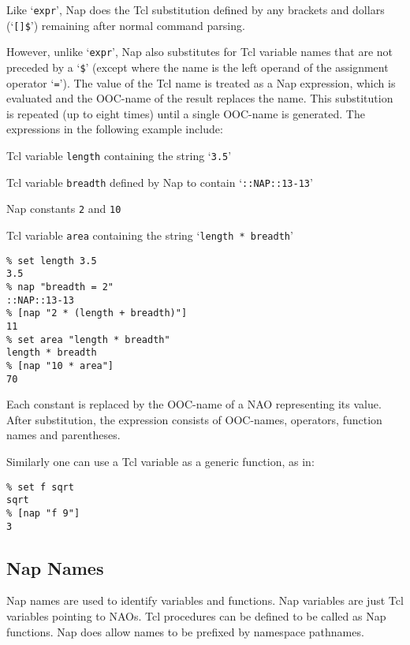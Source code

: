 Like `\texttt{expr}', Nap does the Tcl substitution defined by
    any brackets and dollars (`\texttt{[]\$}') remaining after normal command parsing.
    

However, unlike `\texttt{expr}', Nap also substitutes for Tcl variable
    names that are not preceded by a `\texttt{\$}' (except where the name is the left operand of
    the assignment operator `\texttt{=}'). The value of the Tcl name is treated as a
    Nap expression, which is evaluated and the OOC-name of the result
    replaces the name. This substitution is repeated (up to eight
    times) until a single OOC-name is generated. The expressions in the
    following example include:
\begin{bullets}
      \item Tcl variable 
      \texttt{length} containing the string `\texttt{3.5}'
      \item Tcl variable 
      \texttt{breadth} defined by Nap to contain `\texttt{::NAP::13-13}'
      \item Nap constants 
      \texttt{2} and 
      \texttt{10}
      \item Tcl variable 
      \texttt{area} containing the string `\texttt{length * breadth}'
\end{bullets}
\begin{verbatim}
% set length 3.5
3.5
% nap "breadth = 2"
::NAP::13-13
% [nap "2 * (length + breadth)"]
11
% set area "length * breadth"
length * breadth
% [nap "10 * area"]
70
\end{verbatim}

    

Each constant is replaced by the OOC-name of a NAO representing
    its value. After substitution, the expression consists of
    OOC-names, operators, function names and parentheses.
    

Similarly one can use a Tcl variable as a generic function, as
    in:
    \begin{verbatim}
% set f sqrt
sqrt
% [nap "f 9"]
3
\end{verbatim}

\subsection{Nap Names}
      \label{syntax-Names}

Nap names are used to identify variables and functions.
Nap variables are just Tcl variables pointing to NAOs.
Tcl procedures can be defined to be called as Nap functions.
Nap does allow names to be prefixed by namespace pathnames.

